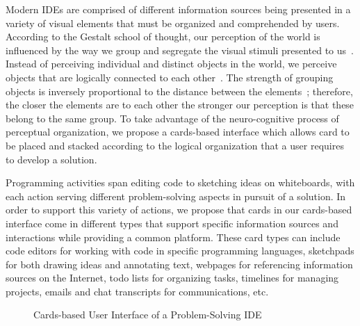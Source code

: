 \documentclass{ppig}
\begin{document}
Modern IDEs are comprised of different information sources being presented in a variety of visual elements that must be organized and comprehended by users.
According to the Gestalt school of thought, our perception of the world is influenced by the way we group and segregate the visual stimuli presented to us~\cite{kimchi2003perceptual}.
Instead of perceiving individual and distinct objects in the world, we perceive objects that are logically connected to each other~\cite{kimchi2003perceptual}.
The strength of grouping objects is inversely proportional to the distance between the elements~\cite{bergman2009peirce}; therefore, the closer the elements are to each other the stronger our perception is that these belong to the same group.
To take advantage of the neuro-cognitive process of perceptual organization, we propose a cards-based interface which allows card to be placed and stacked according to the logical organization that a user requires to develop a solution.

Programming activities span editing code to sketching ideas on whiteboards, with each action serving different problem-solving aspects in pursuit of a solution.
In order to support this variety of actions, we propose that cards in our cards-based interface come in different types that support specific information sources and interactions while providing a common platform.
These card types can include code editors for working with code in specific programming languages, sketchpads for both drawing ideas and annotating text, webpages for referencing information sources on the Internet, todo lists for organizing tasks, timelines for managing projects, emails and chat transcripts for communications, etc.

\begin{figure}[h!]
	\caption{Cards-based User Interface of a Problem-Solving IDE}
	\label{mockup}
	\vspace*{-1.5\baselineskip}
\end{figure}
\end{document}
